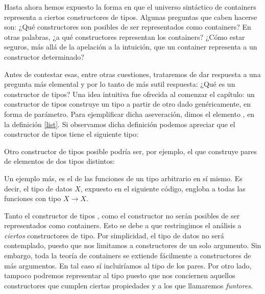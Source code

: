 Hasta ahora hemos expuesto la forma en que el universo sintáctico de
containers representa a ciertos constructores de tipos. Algunas preguntas que caben hacerse son: ¿Qué constructores son posibles de ser representados como containers? En otras palabras, ¿a qué constructores representan los containers? ¿Cómo estar seguros, más allá de la apelación a la intuición, que un container representa a un constructor determinado?

Antes de contestar esas, entre otras cuestiones, trataremos de dar respuesta a una pregunta más elemental y por lo tanto de más sutil respuesta: ¿Qué es un constructor de tipos?
Una idea intuitiva fue ofrecida al comenzar el capítulo: un constructor de tipos construye un tipo a partir de otro dado genéricamente, en forma de parámetro.
Para ejemplificar dicha aseveración, dimos el elemento , en la definición \ref{list}.
Si observamos dicha definición podemos apreciar que el constructor de tipos  tiene el siguiente tipo: 

\sangrar
{} \AgdaSymbol{:}  \AgdaSymbol{$\to$} 

Otro constructor de tipos posible podría ser, por ejemplo, el que construye pares de elementos de dos tipos distintos:

 
Un ejemplo más, es el de las funciones de un tipo arbitrario en sí mismo. Es decir, el tipo de datos  $X$, expuesto en el siguiente código, engloba a todas las funciones con tipo $X \to X$. 
 

 Tanto el constructor de tipos , como el constructor  no serán posibles de ser representados como containers. Esto se debe a que restringimos el análisis a {\it ciertos} constructores de tipo.
Por simplicidad, el tipo de datos  no será contemplado, puesto que nos limitamos a constructores de un solo argumento. Sin embargo, toda la teoría de containers se extiende fácilmente a constructores de más argumentos. En tal caso sí incluiríamos al tipo de los pares. 
 Por otro lado, tampoco podremos representar al tipo  puesto que nos conciernen aquellos constructores que cumplen ciertas propiedades y a los que llamaremos {\it funtores}.


